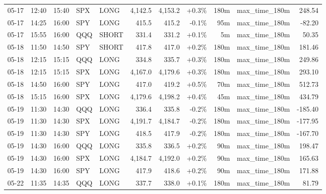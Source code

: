 \documentclass[11pt,a4paper,twoside]{article}
\begin{document}
\begin{center}
\begin{longtable}{>{\color{txtmain}}l l l l l r r r r >{\color{txtmain}}l r}
05-17 & 12:40 & 15:40 & SPX & LONG & 4,142.5 & 4,153.2 & \textcolor{wingreen}{+0.3\%} & 180m & max\_time\_180m & \textcolor{wingreen}{248.54} \\
05-17 & 14:25 & 16:00 & SPY & LONG & 415.5 & 415.2 & \textcolor{lossred}{-0.1\%} & 95m & max\_time\_180m & \textcolor{lossred}{-82.20} \\
05-17 & 15:55 & 16:00 & QQQ & SHORT & 331.4 & 331.2 & \textcolor{wingreen}{+0.1\%} & 5m & max\_time\_180m & \textcolor{wingreen}{50.35} \\
05-18 & 11:50 & 14:50 & SPY & SHORT & 417.8 & 417.0 & \textcolor{wingreen}{+0.2\%} & 180m & max\_time\_180m & \textcolor{wingreen}{181.46} \\
05-18 & 12:15 & 15:15 & QQQ & LONG & 334.8 & 335.7 & \textcolor{wingreen}{+0.3\%} & 180m & max\_time\_180m & \textcolor{wingreen}{249.86} \\
05-18 & 12:15 & 15:15 & SPX & LONG & 4,167.0 & 4,179.6 & \textcolor{wingreen}{+0.3\%} & 180m & max\_time\_180m & \textcolor{wingreen}{293.10} \\
05-18 & 14:50 & 16:00 & SPY & LONG & 417.0 & 419.2 & \textcolor{wingreen}{+0.5\%} & 70m & max\_time\_180m & \textcolor{wingreen}{512.73} \\
05-18 & 15:15 & 16:00 & SPX & LONG & 4,179.6 & 4,198.2 & \textcolor{wingreen}{+0.4\%} & 45m & max\_time\_180m & \textcolor{wingreen}{434.79} \\
05-19 & 11:30 & 14:30 & QQQ & LONG & 336.4 & 335.8 & \textcolor{lossred}{-0.2\%} & 180m & max\_time\_180m & \textcolor{lossred}{-185.40} \\
05-19 & 11:30 & 14:30 & SPX & LONG & 4,191.7 & 4,184.7 & \textcolor{lossred}{-0.2\%} & 180m & max\_time\_180m & \textcolor{lossred}{-177.95} \\
05-19 & 11:30 & 14:30 & SPY & LONG & 418.5 & 417.9 & \textcolor{lossred}{-0.2\%} & 180m & max\_time\_180m & \textcolor{lossred}{-167.70} \\
05-19 & 14:30 & 16:00 & QQQ & LONG & 335.8 & 336.5 & \textcolor{wingreen}{+0.2\%} & 90m & max\_time\_180m & \textcolor{wingreen}{198.47} \\
05-19 & 14:30 & 16:00 & SPX & LONG & 4,184.7 & 4,192.0 & \textcolor{wingreen}{+0.2\%} & 90m & max\_time\_180m & \textcolor{wingreen}{165.63} \\
05-19 & 14:30 & 16:00 & SPY & LONG & 417.9 & 418.6 & \textcolor{wingreen}{+0.2\%} & 90m & max\_time\_180m & \textcolor{wingreen}{171.88} \\
05-22 & 11:35 & 14:35 & QQQ & LONG & 337.7 & 338.0 & \textcolor{wingreen}{+0.1\%} & 180m & max\_time\_180m & \textcolor{wingreen}{81.79} \\

\end{longtable}
\end{center}
\end{document}
